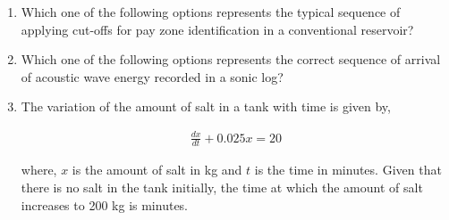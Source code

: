 \documentclass[journal,12pt,onecolumn]{IEEEtran}
\theoremstyle{remark}
\begin{document}
\begin{enumerate}
\item Which one of the following options represents the typical sequence of applying cut-offs for pay zone identification in a conventional reservoir? 

\hfill{}

\begin{enumerate} 
\end{enumerate}

\item Which one of the following options represents the correct sequence of arrival of acoustic wave energy recorded in a sonic log? 

\hfill{}

\begin{enumerate}
\end{enumerate}

\item The variation of the amount of salt in a tank with time is given by, 

\hfill{}

\begin{align*} 
\frac{dx}{dt} + 0.025x = 20
\end{align*}

where, $x$ is the amount of salt in kg and $t$ is the time in minutes. Given that there is no salt in the tank initially, the time at which the amount of salt increases to 200 kg is \underline{\hspace{2cm}} minutes. 


\end{enumerate}
\end{document}
